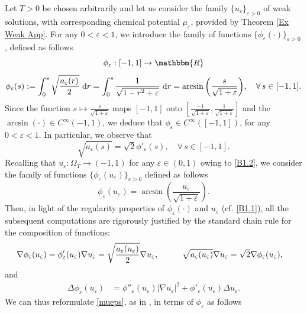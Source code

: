 \documentclass[11pt,  reqno]{amsart}%
\theoremstyle{plain}
\theoremstyle{definition}
\theoremstyle{remark}
\numberwithin{equation}{section}
\newcommand{\ve}{\varepsilon}
\newcommand{\dr}{\textup{d}r}
\begin{document}
	Let $T>0$ be chosen arbitrarily and let us consider the family $\{ u_{\ve} \}_{\ve>0}$ of weak solutions, with corresponding chemical potential $\mu_{\ve}$, provided by Theorem \ref{Ex Weak App}.
For any $0< \varepsilon <1$, we introduce the family of functions $\{ \phi_\ve(\cdot) \}_{\ve>0}$, defined as follows
$$
\phi_{\ve}: [-1,1] \to \mathbbm{R}
$$
 \begin{equation}
        \label{phieps}
        \phi_{\ve}(s):= \int_0^{s} \sqrt{\dfrac{a_{\ve}(r)}{2}}\ \dr 
        = \int_0^{s}  \dfrac{1}{\sqrt{1-r^2+\ve}}\ \dr = \arcsin \left( \dfrac{s}{\sqrt{1+\ve}}\right)\!, 
     \quad \forall \, s \in [-1,1].
    \end{equation}
Since the function $s \mapsto \frac{s}{\sqrt{1+\varepsilon}}$ maps $[-1,1]$ onto $\left[ \frac{-1}{\sqrt{1+\varepsilon}}, \frac{1}{\sqrt{1+\varepsilon}}\right]$ and the $\arcsin(\cdot) \in C^\infty(-1,1)$, we deduce that $\phi_{\ve} \in C^\infty([-1,1])$, for any $0<\varepsilon<1$. In particular, we observe that
$$
 \sqrt{a_\ve(s)}= \sqrt{2}\phi'_{\ve}(s), \quad \forall \, s \in [-1,1].
$$
 Recalling that $u_\ve: \Omega_T \to (-1,1)$ for any $ \ve \in (0,1)$ owing to \eqref{B1.2},
we consider the family of functions $\{ \phi_\ve(u_{\ve}) \}_{\ve>0}$ defined as follows
$$
\phi_\ve(u_{\ve})=\arcsin \left( \dfrac{u_{\ve}}{\sqrt{1+\ve}}\right).
$$ 
Then, in light of the regularity properties of $\phi_\ve(\cdot)$ and $u_\varepsilon$ (cf. \eqref{B1.1}), all the subsequent computations are rigorously justified by the standard chain rule for the composition of functions:
 \begin{align}
    \nabla \phi_{\ve}(u_{\ve})&=\phi'_{\ve}(u_{\ve})\nabla u_{\ve} = \sqrt{\dfrac{a_{\ve}(u_{\ve})}{2}} \nabla u_{\ve},\hspace{1.0 cm} \sqrt{a_{\ve}(u_{\ve})}\nabla u_{\ve}= \sqrt{2}\nabla \phi_{\ve}(u_{\ve}),
 \label{nabla phi}
 \end{align}
 and 
 \begin{align}
    \Delta \phi_{\ve} (u_{\ve})&= \phi''_{\ve}(u_{\ve})|\nabla u_{\ve}|^2+\phi'_{\ve}(u_{\ve})\Delta u_{\ve}. \label{delta phi}
    \end{align}
    We can thus reformulate \eqref{mueps}, as in \cite{SP2013}, in terms of $\phi_{\ve}$ as follows
\end{document}
